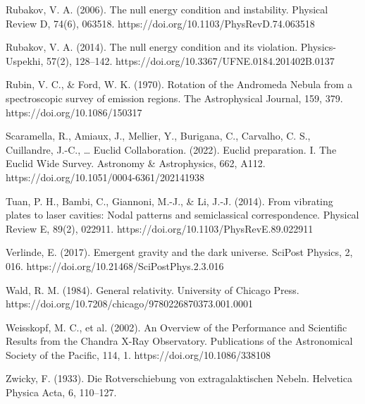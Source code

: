 Rubakov, V. A. (2006). The null energy condition and instability. Physical Review D, 74(6), 063518. https://doi.org/10.1103/PhysRevD.74.063518

Rubakov, V. A. (2014). The null energy condition and its violation. Physics-Uspekhi, 57(2), 128--142. https://doi.org/10.3367/UFNE.0184.201402B.0137

Rubin, V. C., \& Ford, W. K. (1970). Rotation of the Andromeda Nebula from a spectroscopic survey of emission regions. The Astrophysical Journal, 159, 379. https://doi.org/10.1086/150317

Scaramella, R., Amiaux, J., Mellier, Y., Burigana, C., Carvalho, C. S., Cuillandre, J.-C., \ldots{} Euclid Collaboration. (2022). Euclid preparation. I. The Euclid Wide Survey. Astronomy \& Astrophysics, 662, A112. https://doi.org/10.1051/0004-6361/202141938

Tuan, P. H., Bambi, C., Giannoni, M.-J., \& Li, J.-J. (2014). From vibrating plates to laser cavities: Nodal patterns and semiclassical correspondence. Physical Review E, 89(2), 022911. https://doi.org/10.1103/PhysRevE.89.022911

Verlinde, E. (2017). Emergent gravity and the dark universe. SciPost Physics, 2, 016. https://doi.org/10.21468/SciPostPhys.2.3.016

Wald, R. M. (1984). General relativity. University of Chicago Press. https://doi.org/10.7208/chicago/9780226870373.001.0001

Weisskopf, M. C., et al. (2002). An Overview of the Performance and Scientific Results from the Chandra X-Ray Observatory. Publications of the Astronomical Society of the Pacific, 114, 1. https://doi.org/10.1086/338108

Zwicky, F. (1933). Die Rotverschiebung von extragalaktischen Nebeln. Helvetica Physica Acta, 6, 110--127.





